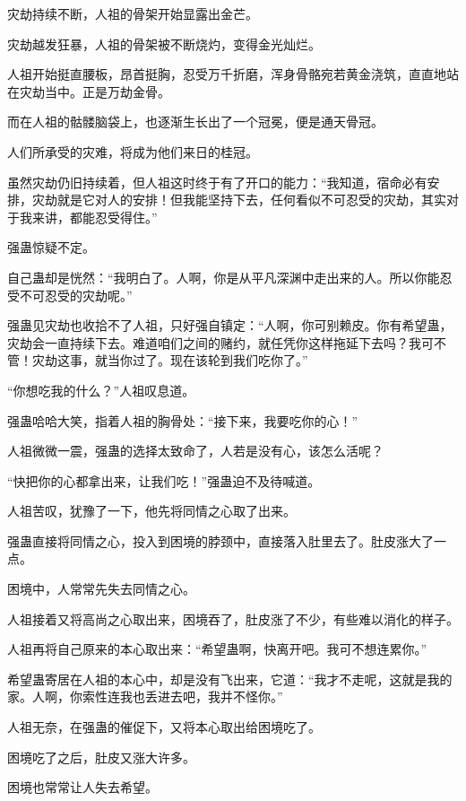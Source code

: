 
\begin{this_body}

灾劫持续不断，人祖的骨架开始显露出金芒。

灾劫越发狂暴，人祖的骨架被不断烧灼，变得金光灿烂。

人祖开始挺直腰板，昂首挺胸，忍受万千折磨，浑身骨骼宛若黄金浇筑，直直地站在灾劫当中。正是万劫金骨。

而在人祖的骷髅脑袋上，也逐渐生长出了一个冠冕，便是通天骨冠。

人们所承受的灾难，将成为他们来日的桂冠。

虽然灾劫仍旧持续着，但人祖这时终于有了开口的能力：“我知道，宿命必有安排，灾劫就是它对人的安排！但我能坚持下去，任何看似不可忍受的灾劫，其实对于我来讲，都能忍受得住。”

强蛊惊疑不定。

自己蛊却是恍然：“我明白了。人啊，你是从平凡深渊中走出来的人。所以你能忍受不可忍受的灾劫呢。”

强蛊见灾劫也收拾不了人祖，只好强自镇定：“人啊，你可别赖皮。你有希望蛊，灾劫会一直持续下去。难道咱们之间的赌约，就任凭你这样拖延下去吗？我可不管！灾劫这事，就当你过了。现在该轮到我们吃你了。”

“你想吃我的什么？”人祖叹息道。

强蛊哈哈大笑，指着人祖的胸骨处：“接下来，我要吃你的心！”

人祖微微一震，强蛊的选择太致命了，人若是没有心，该怎么活呢？

“快把你的心都拿出来，让我们吃！”强蛊迫不及待喊道。

人祖苦叹，犹豫了一下，他先将同情之心取了出来。

强蛊直接将同情之心，投入到困境的脖颈中，直接落入肚里去了。肚皮涨大了一点。

困境中，人常常先失去同情之心。

人祖接着又将高尚之心取出来，困境吞了，肚皮涨了不少，有些难以消化的样子。

人祖再将自己原来的本心取出来：“希望蛊啊，快离开吧。我可不想连累你。”

希望蛊寄居在人祖的本心中，却是没有飞出来，它道：“我才不走呢，这就是我的家。人啊，你索性连我也丢进去吧，我并不怪你。”

人祖无奈，在强蛊的催促下，又将本心取出给困境吃了。

困境吃了之后，肚皮又涨大许多。

困境也常常让人失去希望。


\end{this_body}
